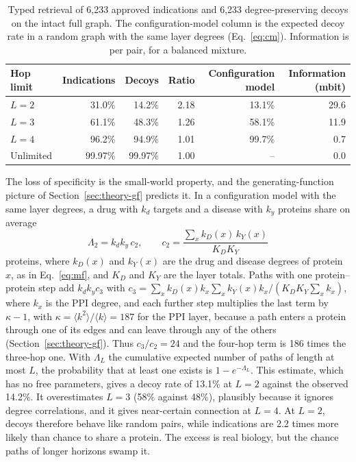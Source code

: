 \begin{table}[!htbp]
\centering
\small
\caption{Typed retrieval of 6,233 approved indications and 6,233
degree-preserving decoys on the intact full graph. The configuration-model
column is the expected decoy rate in a random graph with the same layer degrees
(Eq.~\eqref{eq:cm}). Information is per pair, for a balanced mixture.}
\label{tab:indications}
\begin{tabular}{@{}lrrrrr@{}}
\toprule
Hop limit & Indications & Decoys & Ratio & Configuration model & Information (mbit) \\
\midrule
$L=2$      & 31.0\% & 14.2\% & 2.18 & 13.1\% & 29.6 \\
$L=3$      & 61.1\% & 48.3\% & 1.26 & 58.1\% & 11.9 \\
$L=4$      & 96.2\% & 94.9\% & 1.01 & 99.7\% & 0.7 \\
Unlimited  & 99.97\% & 99.97\% & 1.00 & -- & 0.0 \\
\bottomrule
\end{tabular}
\end{table}

The loss of specificity is the small-world property, and the generating-function
picture of Section~\ref{sec:theory-gf} predicts it. In a configuration model
with the same layer degrees, a drug with $k_d$ targets and a disease with $k_y$
proteins share on average
\begin{equation}
\Lambda_2 = k_d k_y\, c_2,\qquad c_2=\frac{\sum_x k_D(x)\,k_Y(x)}{K_D K_Y}
\label{eq:cm}
\end{equation}
proteins, where $k_D(x)$ and $k_Y(x)$ are the drug and disease degrees of protein
$x$, as in Eq.~\eqref{eq:mf}, and $K_D$ and $K_Y$ are the layer totals. Paths
with one protein--protein step add $k_d k_y c_3$ with
$c_3=\sum_x k_D(x)k_x\sum_x k_Y(x)k_x/(K_D K_Y \sum_x k_x)$, where $k_x$ is the
PPI degree, and each further step multiplies the last term by $\kappa-1$, with
$\kappa=\langle k^2\rangle/\langle k\rangle=187$ for the PPI layer, because a
path enters a protein through one of its edges and can leave through any of the
others (Section~\ref{sec:theory-gf}). Thus $c_3/c_2=24$ and the four-hop term is
186 times the three-hop one. With $\Lambda_L$ the cumulative expected number of
paths of length at most $L$, the probability that at least one exists is
$1-e^{-\Lambda_L}$. This estimate,
which has no free parameters, gives a decoy rate of 13.1\% at $L=2$ against the
observed 14.2\%. It overestimates $L=3$ (58\% against 48\%), plausibly because it ignores
degree correlations, and it gives near-certain connection at $L=4$. At $L=2$,
decoys therefore behave like random pairs, while indications are 2.2 times more
likely than chance to share a protein. The excess is real biology, but the chance
paths of longer horizons swamp it.

